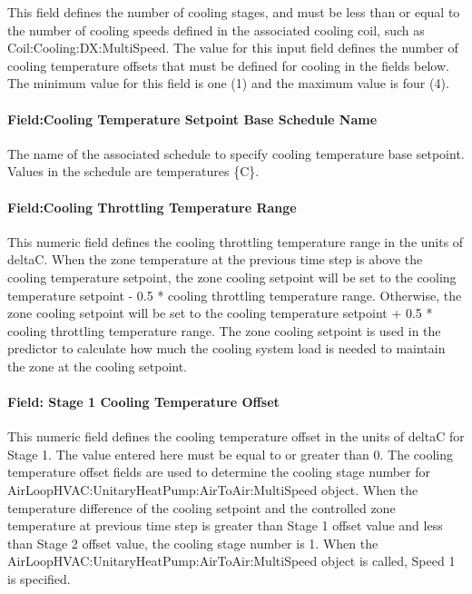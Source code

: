 This field defines the number of cooling stages, and must be less than or equal to the number of cooling speeds defined in the associated cooling coil, such as Coil:Cooling:DX:MultiSpeed. The value for this input field defines the number of cooling temperature offsets that must be defined for cooling in the fields below. The minimum value for this field is one (1) and the maximum value is four (4).

\paragraph{Field:Cooling Temperature Setpoint Base Schedule Name}\label{fieldcooling-temperature-setpoint-base-schedule-name}

The name of the associated schedule to specify cooling temperature base setpoint. Values in the schedule are temperatures \{C\}.

\paragraph{Field:Cooling Throttling Temperature Range}\label{fieldcooling-throttling-temperature-range}

This numeric field defines the cooling throttling temperature range in the units of deltaC. When the zone temperature at the previous time step is above the cooling temperature setpoint, the zone cooling setpoint will be set to the cooling temperature setpoint - 0.5 * cooling throttling temperature range. Otherwise, the zone cooling setpoint will be set to the cooling temperature setpoint + 0.5 * cooling throttling temperature range. The zone cooling setpoint is used in the predictor to calculate how much the cooling system load is needed to maintain the zone at the cooling setpoint.

\paragraph{Field: Stage 1 Cooling Temperature Offset}\label{field-stage-1-cooling-temperature-offset}

This numeric field defines the cooling temperature offset in the units of deltaC for Stage 1. The value entered here must be equal to or greater than 0. The cooling temperature offset fields are used to determine the cooling stage number for AirLoopHVAC:UnitaryHeatPump:AirToAir:MultiSpeed object. When the temperature difference of the cooling setpoint and the controlled zone temperature at previous time step is greater than Stage 1 offset value and less than Stage 2 offset value, the cooling stage number is 1. When the AirLoopHVAC:UnitaryHeatPump:AirToAir:MultiSpeed object is called, Speed 1 is specified.

